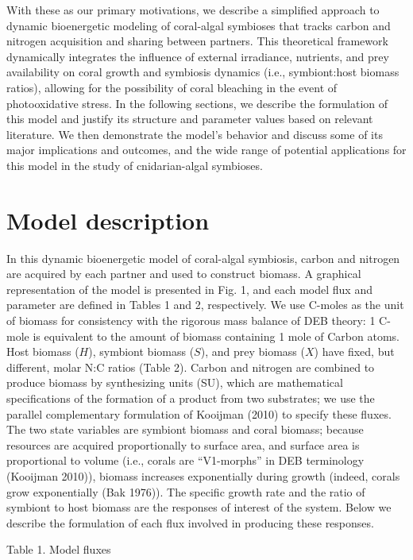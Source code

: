 \documentclass[]{elsarticle} %
\begin{document}
With these as our primary motivations, we describe a simplified approach
to dynamic bioenergetic modeling of coral-algal symbioses that tracks
carbon and nitrogen acquisition and sharing between partners. This
theoretical framework dynamically integrates the influence of external
irradiance, nutrients, and prey availability on coral growth and
symbiosis dynamics (i.e., symbiont:host biomass ratios), allowing for
the possibility of coral bleaching in the event of photooxidative
stress. In the following sections, we describe the formulation of this
model and justify its structure and parameter values based on relevant
literature. We then demonstrate the model's behavior and discuss some of
its major implications and outcomes, and the wide range of potential
applications for this model in the study of cnidarian-algal symbioses.

\section{Model description}\label{model-description}

In this dynamic bioenergetic model of coral-algal symbiosis, carbon and
nitrogen are acquired by each partner and used to construct biomass. A
graphical representation of the model is presented in Fig. 1, and each
model flux and parameter are defined in Tables 1 and 2, respectively. We
use C-moles as the unit of biomass for consistency with the rigorous
mass balance of DEB theory: 1 C-mole is equivalent to the amount of
biomass containing 1 mole of Carbon atoms. Host biomass (\(H\)),
symbiont biomass (\(S\)), and prey biomass (\(X\)) have fixed, but
different, molar N:C ratios (Table 2). Carbon and nitrogen are combined
to produce biomass by synthesizing units (SU), which are mathematical
specifications of the formation of a product from two substrates; we use
the parallel complementary formulation of Kooijman (2010) to specify
these fluxes. The two state variables are symbiont biomass and coral
biomass; because resources are acquired proportionally to surface area,
and surface area is proportional to volume (i.e., corals are
``V1-morphs'' in DEB terminology (Kooijman 2010)), biomass increases
exponentially during growth (indeed, corals grow exponentially (Bak
1976)). The specific growth rate and the ratio of symbiont to host
biomass are the responses of interest of the system. Below we describe
the formulation of each flux involved in producing these responses.

Table 1. Model fluxes
\end{document}
